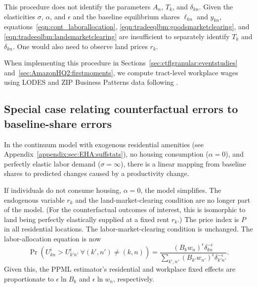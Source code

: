 \documentclass[11pt]{article}
\theoremstyle{definition}
\begin{document}
This procedure does not identify the parameters $A_n$, $T_k$, and $\delta_{kn}$.
Given the elasticities $\sigma$, $\alpha$, and $\epsilon$ and the baseline equilibrium shares $\ell_{kn}$ and $y_{kn}$,
equations~\eqref{eqn:cont_laborallocation},
\eqref{eqn:tradeeqlbm:goodsmarketclearing}, and
\eqref{eqn:tradeeqlbm:landsmarketclearing}
are insufficient to separately identify $T_k$ and $\delta_{kn}$.
One would also need to observe land prices $r_k$.

When implementing this procedure in Sections~\ref{sec:ctflgranular:eventstudies} and~\ref{sec:AmazonHQ2:firstmoments},
we compute tract-level workplace wages using LODES and ZIP Business Patterns data following .

\subsection{Special case relating counterfactual errors to baseline-share errors\label{sec:appendix:theory:continuum:linearchanges}}

In the continuum model with exogenous residential amenities (see Appendix~\ref{appendix:sec:EHA:suffstats}), no housing consumption ($\alpha = 0$), and perfectly elastic labor demand ($\sigma = \infty$),
there is a linear mapping from baseline shares to predicted changes caused by a productivity change.

If individuals do not consume housing, $\alpha = 0$, the model simplifies.
The endogenous variable $r_k$ and the land-market-clearing condition are no longer part of the model.
(For the counterfactual outcomes of interest, this is isomorphic to land being perfectly elastically supplied at a fixed rent $r_k$.)
The price index is $P$ in all residential locations.
The labor-market-clearing condition is unchanged.
The labor-allocation equation is now
\begin{equation*}
  \Pr(U_{kn}^{i} > U_{k'n'}^{i} \ \forall (k',n') \neq (k,n)) 
  =
  \frac
  {\left(B_k {w}_{n}\right)^\epsilon \delta_{kn}^{-\epsilon}}
  {\sum_{k',n'} \left(B_{k'} {w}_{n'}\right)^\epsilon \delta_{k'n'}^{-\epsilon}}
  .
\end{equation*}
Given this, the PPML estimator's residential and workplace fixed effects are proportionate to
$\epsilon \ln B_{k}$ and $\epsilon \ln {w}_{n}$, respectively.
\end{document}
